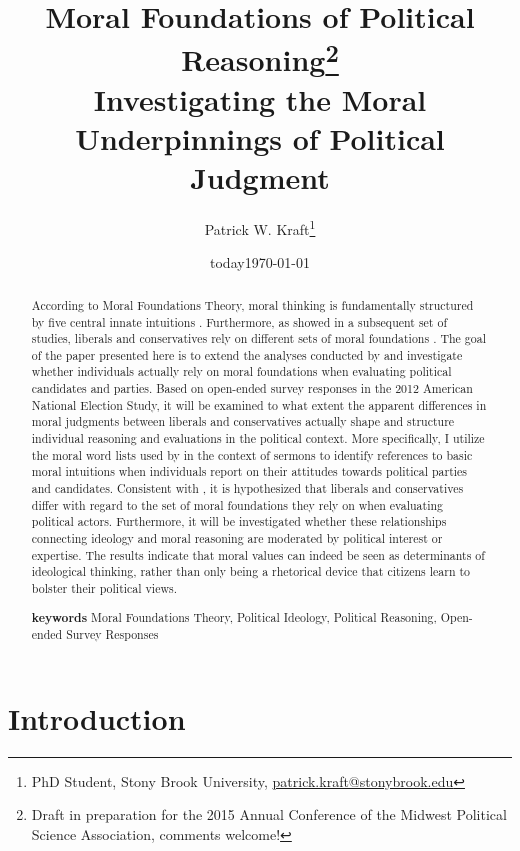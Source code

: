 \documentclass[12pt]{article}
\author{Patrick W. Kraft\footnote{PhD Student, Stony Brook University, \href{mailto:patrick.kraft@stonybrook.edu}{patrick.kraft@stonybrook.edu}}}
\date{today}
\title{Moral Foundations of Political Reasoning\footnote{Draft in preparation for the 2015 Annual Conference of the Midwest Political Science Association, comments welcome!}\\
\large{Investigating the Moral Underpinnings of Political Judgment}}
\date{\today}
\begin{document}
\maketitle

\begin{abstract}%
According to Moral Foundations Theory, moral thinking is fundamentally structured by five central innate intuitions \citep{haidt2008moral}. Furthermore, as \citet{graham2009liberals} showed in a subsequent set of studies, liberals and conservatives rely on different sets of moral foundations \citep[see also][]{haidt2007morality}. The goal of the paper presented here is to extend the analyses conducted by \citet{graham2009liberals} and investigate whether individuals actually rely on moral foundations when evaluating political candidates and parties. Based on open-ended survey responses in the 2012 American National Election Study, it will be examined to what extent the apparent differences in moral judgments between liberals and conservatives actually shape and structure individual reasoning and evaluations in the political context. More specifically, I utilize the moral word lists used by \citet{graham2009liberals} in the context of sermons to identify references to basic moral intuitions when individuals report on their attitudes towards political parties and candidates. Consistent with \citet{graham2009liberals}, it is hypothesized that liberals and conservatives differ with regard to the set of moral foundations they rely on when evaluating political actors. Furthermore, it will be investigated whether these relationships connecting ideology and moral reasoning are moderated by political interest or expertise. The results indicate that moral values can indeed be seen as determinants of ideological thinking, rather than only being a rhetorical device that citizens learn to bolster their political views.

\noindent \textbf{keywords} Moral Foundations Theory, Political Ideology, Political Reasoning, Open-ended Survey Responses
\end{abstract}

\newpage
\singlespacing

\section{Introduction}
\end{document}
